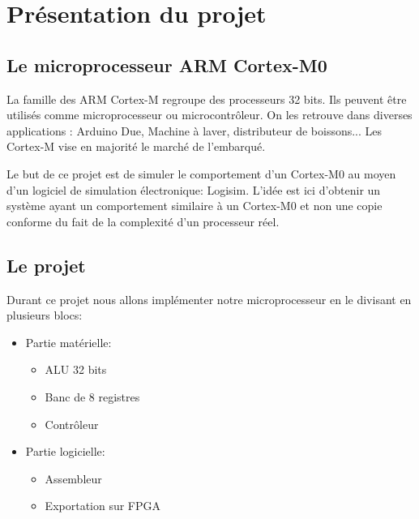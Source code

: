 \section{Présentation du projet}
\subsection{Le microprocesseur ARM Cortex-M0}
	La famille des ARM Cortex-M regroupe des processeurs 32 bits. Ils peuvent être utilisés comme microprocesseur ou microcontrôleur. On les retrouve dans diverses applications : Arduino Due,  Machine à laver, distributeur de boissons...  Les Cortex-M vise en majorité le marché de l'embarqué.

	Le but de ce projet est de simuler le comportement d'un Cortex-M0 au moyen d'un logiciel de simulation électronique: Logisim. L'idée est ici d'obtenir un système ayant un comportement similaire à un Cortex-M0 et non une copie conforme du fait de la complexité d'un processeur réel.

\subsection{Le projet}
	Durant ce projet nous allons implémenter notre microprocesseur en le divisant en plusieurs blocs:
\begin{itemize}
	\item Partie matérielle:
	\begin{itemize}
		\item ALU 32 bits
		\item Banc de 8 registres
		\item Contrôleur
	\end{itemize}
	\item Partie logicielle:
	\begin{itemize}
		\item Assembleur
		\item Exportation sur FPGA
	\end{itemize}
\end{itemize}


